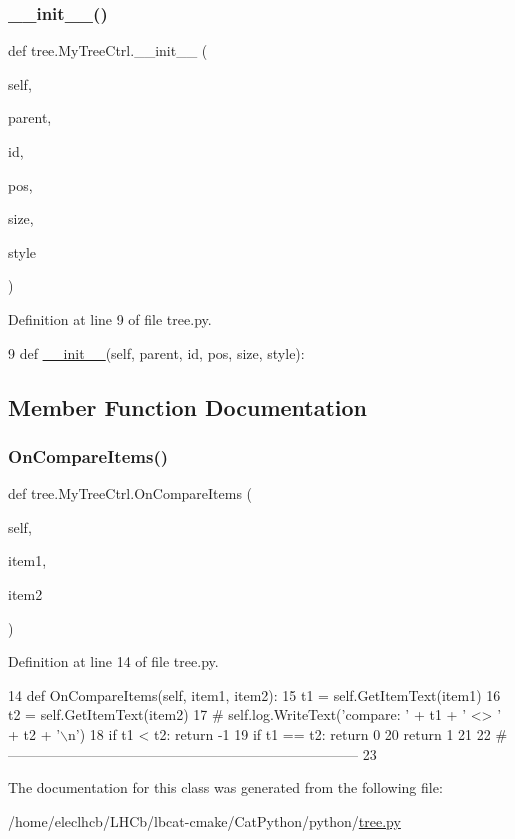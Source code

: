 \subsubsection{\texorpdfstring{\+\_\+\+\_\+init\+\_\+\+\_\+()}{\_\_init\_\_()}}
{\footnotesize\ttfamily def tree.\+My\+Tree\+Ctrl.\+\_\+\+\_\+init\+\_\+\+\_\+ (\begin{DoxyParamCaption}\item[{}]{self,  }\item[{}]{parent,  }\item[{}]{id,  }\item[{}]{pos,  }\item[{}]{size,  }\item[{}]{style }\end{DoxyParamCaption})}



Definition at line 9 of file tree.\+py.


\begin{DoxyCode}
9     \textcolor{keyword}{def }\hyperlink{classwrapper_1_1ModuleDictWrapper_a9a7a794150502f51df687831583e13b9}{\_\_init\_\_}(self, parent, id, pos, size, style):
\end{DoxyCode}


\subsection{Member Function Documentation}
\mbox{\label{classtree_1_1MyTreeCtrl_a8073a87006e33820096e0b2ea305af5c}} 
\subsubsection{\texorpdfstring{On\+Compare\+Items()}{OnCompareItems()}}
{\footnotesize\ttfamily def tree.\+My\+Tree\+Ctrl.\+On\+Compare\+Items (\begin{DoxyParamCaption}\item[{}]{self,  }\item[{}]{item1,  }\item[{}]{item2 }\end{DoxyParamCaption})}



Definition at line 14 of file tree.\+py.


\begin{DoxyCode}
14     \textcolor{keyword}{def }OnCompareItems(self, item1, item2):
15         t1 = self.GetItemText(item1)
16         t2 = self.GetItemText(item2)
17 \textcolor{comment}{#        self.log.WriteText('compare: ' + t1 + ' <> ' + t2 + '\(\backslash\)n')}
18         \textcolor{keywordflow}{if} t1 < t2: \textcolor{keywordflow}{return} -1
19         \textcolor{keywordflow}{if} t1 == t2: \textcolor{keywordflow}{return} 0
20         \textcolor{keywordflow}{return} 1
21 
22 \textcolor{comment}{#---------------------------------------------------------------------------}
23 
\end{DoxyCode}


The documentation for this class was generated from the following file\+:\begin{DoxyCompactItemize}
\item 
/home/eleclhcb/\+L\+H\+Cb/lbcat-\/cmake/\+Cat\+Python/python/\hyperlink{tree_8py}{tree.\+py}\end{DoxyCompactItemize}

